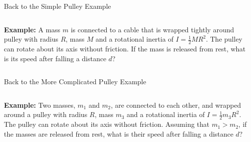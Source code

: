 \documentclass[12pt,compress,aspectratio=169]{beamer}
\begin{document}
\begin{frame}[t]{Back to the Simple Pulley Example}
  \begin{columns}
    \centering

    \textbf{Example:} A mass $m$ is connected to a cable that is wrapped
    tightly around pulley with radius $R$, mass $M$ and a rotational inertia of
    $I=\frac12MR^2$. The pulley can rotate about its axis without friction.
    If the mass is released from rest, what is its speed after falling
    a distance $d$?
  \end{columns}
\end{frame}



\begin{frame}{Back to the More Complicated Pulley Example}
  \begin{columns}[T]
    \centering
    

    \textbf{Example:} Two masses, $m_1$ and $m_2$, are connected to each other,
    and wrapped around a pulley with radius $R$, mass $m_3$ and a rotational
    inertia of $I=\frac12m_3R^2$. The pulley can rotate about its axis without
    friction. Assuming that $m_1>m_2$, if the masses are released from rest,
    what is their speed after falling a distance $d$?
  \end{columns}
\end{frame}
\end{document}
